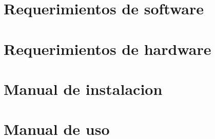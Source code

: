 


		
	
	\newpage

	\tableofcontents
	\newpage

	\graphicspath{{./report/pics/}}

	\section{Requerimientos de software}
		

	\newpage
	\section{Requerimientos de hardware}
		

	\newpage
	\section{Manual de instalacion}
		

	\newpage
	\section{Manual de uso}
		


